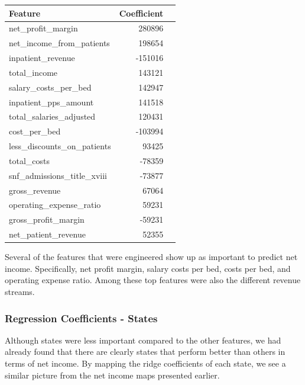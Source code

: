 \documentclass{article}
\theoremstyle{mytheoremstyle}
\theoremstyle{mytheoremstyle}
\theoremstyle{myproblemstyle}
\begin{document}
\begin{table}[ht]
\centering
\begin{tabular}{@{}lrr@{}}
\toprule
{Feature} & {Coefficient} \\
\midrule
net\_profit\_margin & 280896 \\
net\_income\_from\_patients & 198654 \\
inpatient\_revenue & -151016 \\
total\_income & 143121 \\
salary\_costs\_per\_bed & 142947 \\
inpatient\_pps\_amount & 141518 \\
total\_salaries\_adjusted & 120431 \\
cost\_per\_bed & -103994 \\
less\_discounts\_on\_patients & 93425 \\
total\_costs & -78359 \\
snf\_admissions\_title\_xviii & -73877 \\
gross\_revenue & 67064 \\
operating\_expense\_ratio & 59231 \\
gross\_profit\_margin & -59231 \\
net\_patient\_revenue & 52355 \\
\bottomrule
\end{tabular}
\label{tab:model_performance robust}
\end{table}

Several of the features that were engineered show up as important to predict net income. Specifically, net profit margin, salary costs per bed, costs per bed, and operating expense ratio. Among these top features were also the different revenue  streams. 

\pagebreak


\subsubsection{Regression Coefficients - States}

Although states were less important compared to the other features, we had already found that there are clearly states that perform better than others in terms of net income. By mapping the ridge coefficients of each state, we see a similar picture from the net income maps presented earlier.
\end{document}
